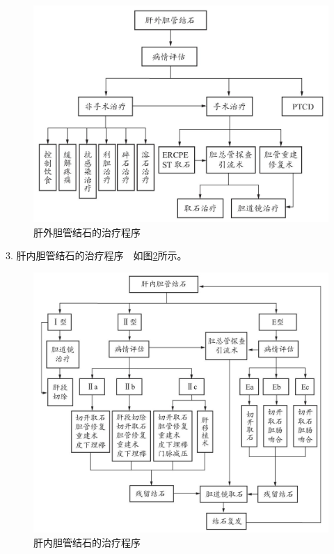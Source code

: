 \begin{figure}[!htbp]
 \centering
 \includegraphics{./images/Image00112.jpg}
 \captionsetup{justification=centering}
 \caption{肝外胆管结石的治疗程序}
 \label{fig3-20-2}
  \end{figure} 

3. 肝内胆管结石的治疗程序　如图\ref{fig3-20-3}所示。

\begin{figure}[!htbp]
 \centering
 \includegraphics{./images/Image00113.jpg}
 \captionsetup{justification=centering}
 \caption{肝内胆管结石的治疗程序}
 \label{fig3-20-3}
  \end{figure} 

